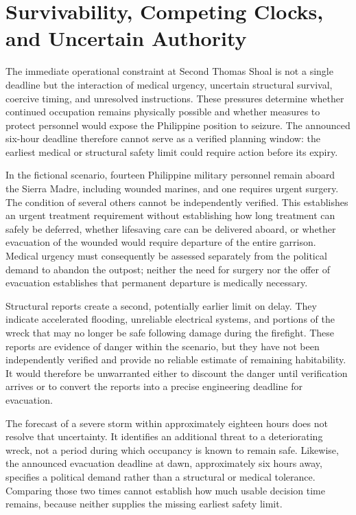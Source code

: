 \documentclass[11pt]{article}
\begin{document}
\section{Survivability, Competing Clocks, and Uncertain Authority}
The immediate operational constraint at Second Thomas Shoal is not a single deadline but the interaction of medical urgency, uncertain structural survival, coercive timing, and unresolved instructions. These pressures determine whether continued occupation remains physically possible and whether measures to protect personnel would expose the Philippine position to seizure. The announced six-hour deadline therefore cannot serve as a verified planning window: the earliest medical or structural safety limit could require action before its expiry.

In the fictional scenario, fourteen Philippine military personnel remain aboard the Sierra Madre, including wounded marines, and one requires urgent surgery. The condition of several others cannot be independently verified. This establishes an urgent treatment requirement without establishing how long treatment can safely be deferred, whether lifesaving care can be delivered aboard, or whether evacuation of the wounded would require departure of the entire garrison. Medical urgency must consequently be assessed separately from the political demand to abandon the outpost; neither the need for surgery nor the offer of evacuation establishes that permanent departure is medically necessary.

Structural reports create a second, potentially earlier limit on delay. They indicate accelerated flooding, unreliable electrical systems, and portions of the wreck that may no longer be safe following damage during the firefight. These reports are evidence of danger within the scenario, but they have not been independently verified and provide no reliable estimate of remaining habitability. It would therefore be unwarranted either to discount the danger until verification arrives or to convert the reports into a precise engineering deadline for evacuation.

The forecast of a severe storm within approximately eighteen hours does not resolve that uncertainty. It identifies an additional threat to a deteriorating wreck, not a period during which occupancy is known to remain safe. Likewise, the announced evacuation deadline at dawn, approximately six hours away, specifies a political demand rather than a structural or medical tolerance. Comparing those two times cannot establish how much usable decision time remains, because neither supplies the missing earliest safety limit.
\end{document}
